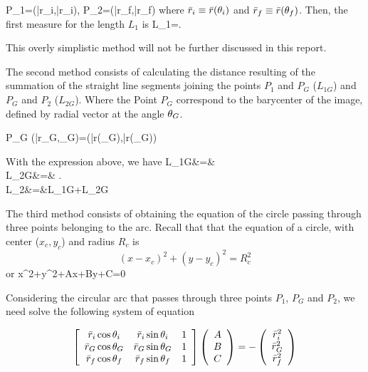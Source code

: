 \beq
P_1=(\bar{r}_i,\bar{r}_{i}), \quad
P_2=(\bar{r}_f,\bar{r}_{f})
\eeq
where $\bar{r}_i\equiv \bar{r}(\theta_i)$ and $\bar{r}_f\equiv \bar{r}(\theta_f)$.
Then, the first measure for the length $L_1$ is
\beq
L_1=.
\label{first_length_def}
\eeq

This overly simplistic method will not be further discussed in this report.

The second method consists of calculating the distance resulting of
the summation of the straight line segments joining the points $P_1$
and $P_G$ ($L_{1G}$) and $P_G$ and $P_2$ ($L_{2G}$). Where the Point
$P_G$ correspond to the barycenter of the image, defined by radial
vector at the angle $\theta_G$.

\beq
P_G\equiv
(\bar{r}_G,\te_G)=(\bar{r}(\te_G),\bar{r}(\te_G))
\eeq

With the expression above, we have
\bea
L_{1G}&=&\\ 
L_{2G}&=&
.\\
L_2&=&L_{1G}+L_{2G}
\eea

The third method consists of obtaining the equation of the circle
passing through three points belonging to the arc. Recall that that
the equation of a circle, with center ($x_{c},y_{c}$) and radius $R_c$
is
\begin{equation*}
 (x-x_c)^2+(y-y_c)^2=R^2_c
\end{equation*}
or
\beq
x^2+y^2+Ax+By+C=0\\
\eeq 

Considering the circular arc that passes through three points $P_1$, $P_G$ and
$P_2$, we need solve the following system of equation


\begin{equation}
 \left[\begin{array}{c c c}
        \bar{r}_i\cos{\theta_i} & \bar{r}_i\sin{\theta_i} & 1\\
	\bar{r}_G\cos{\theta_G} & \bar{r}_G\sin{\theta_G} & 1\\
	\bar{r}_f\cos{\theta_f} & \bar{r}_f\sin{\theta_f} & 1\\
\end{array} \right]\left(\begin{array}{c} A \\ B\\ C
\end{array}\right)=-\left(\begin{array}{c}                         
\bar{r}^2_i\\ \bar{r}^2_G\\ \bar{r}^2_f\end{array}  \right) 
\end{equation}


